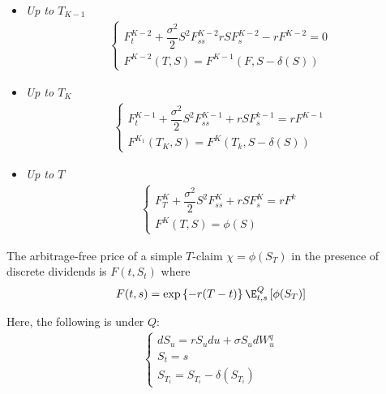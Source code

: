 \begin{itemize}
  \item \textit{Up to $T_{K-1}$}
    \begin{equation*}
      \begin{gathered}
        \begin{cases}
          F_t^{K-2}+\dfrac{\sigma^2}{2}S^2F_{ss}^{K-2}rSF_s^{K-2}-rF^{K-2}=0\\
          F^{K-2}(T,S) = F^{K-1}(F,S-\delta(S))
        \end{cases}
      \end{gathered}
    \end{equation*}
    \par\bigskip
  \item \textit{Up to $T_K$}
    \begin{equation*}
      \begin{gathered}
        \begin{cases}
          F_t^{K-1}+\dfrac{\sigma^2}{2}S^2F_{ss}^{K-1}+rSF_s^{k-1}=rF^{K-1}\\
          F^{K_1}(T_K,S) = F^K(T_k,S-\delta(S))
        \end{cases}
      \end{gathered}
    \end{equation*}
    \par\bigskip
  \item\textit{Up to $T$}
    \begin{equation*}
      \begin{gathered}
        \begin{cases}
          F_T^K+\dfrac{\sigma^2}{2}S^2F_{ss}^K+rSF_s^K=rF^k\\
          F^K(T,S) =\phi(S)
        \end{cases}
      \end{gathered}
    \end{equation*}
\end{itemize}
\par\bigskip
\begin{lem}{}
  The arbitrage-free price of a simple $T$-claim $\chi = \phi(S_T)$ in the presence of discrete dividends is $F(t,S_t)$ where 
  \begin{equation*}
    \begin{gathered}
      F(t,s) = \text{exp}\left\{-r(T-t)\right\}\E_{t,s}^Q\left[\phi(S_T)\right]
    \end{gathered}
  \end{equation*}\par
  \noindent Here, the following is under $Q$:
  \begin{equation*}
    \begin{gathered}
      \begin{cases}
        dS_u =rS_udu+\sigma S_udW_u^q\\
        S_t=s\\
        S_{T_i} = S_{T_i}-\delta(S_{T_i})
      \end{cases}
    \end{gathered}
  \end{equation*}
\end{lem}

